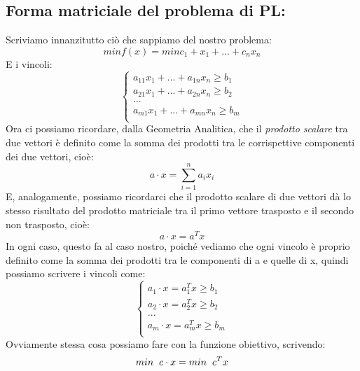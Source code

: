 \subsection{Forma matriciale del problema di PL:}
Scriviamo innanzitutto ciò che sappiamo del nostro problema:
\begin{equation*}
    min f(x) = min c_1 + x_1 + ... + c_n x_n 
\end{equation*}
E i vincoli:
\begin{equation*}
    \begin{cases}
        \text{$a_{11}x_1 + ... + a_{1n}x_n \geq b_1$}\\
        \text{$a_{21}x_1 + ... + a_{2n}x_n \geq b_2$}\\
        \text{...}\\
        \text{$a_{m1}x_1 + ... + a_{mn}x_n \geq b_m$}\\
    \end{cases}
\end{equation*}
Ora ci possiamo ricordare, dalla Geometria Analitica, che il \textit{prodotto scalare} tra due vettori è definito come la somma dei prodotti tra le corrispettive componenti dei due vettori, cioè:
\begin{equation*}
    a \cdot x = \sum_{i=1}^n a_ix_i
\end{equation*}
E, analogamente, possiamo ricordarci che il prodotto scalare di due vettori dà lo stesso risultato del prodotto matriciale tra il primo vettore trasposto e il secondo non trasposto, cioè:
\begin{equation*}
    a \cdot x = a^{T}x
\end{equation*}
In ogni caso, questo fa al caso nostro, poiché vediamo che ogni vincolo è proprio definito come la somma dei prodotti tra le componenti di a e quelle di x, quindi possiamo scrivere i vincoli come:
\begin{equation*}
    \begin{cases}
        \text{$a_1\cdot x = a_1^{T}x \geq b_1$}\\
        \text{$a_2\cdot x = a_2^{T}x \geq b_2$}\\
        \text{...}\\
        \text{$a_m\cdot x = a_m^{T}x \geq b_m$}\\
    \end{cases}
\end{equation*}
Ovviamente stessa cosa possiamo fare con la funzione obiettivo, scrivendo:
\begin{equation*}
    min \hspace{0.2cm} c \cdot x = min \hspace{0.2cm} c^{T}x
\end{equation*}
